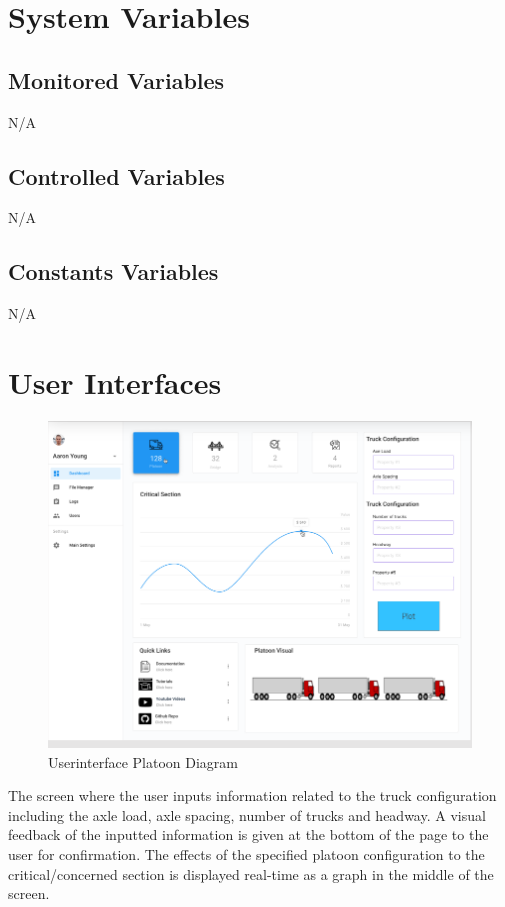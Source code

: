 \documentclass[12pt, titlepage]{article}
\begin{document}
\section{System Variables}

\subsection{Monitored Variables}
N/A
\subsection{Controlled Variables}
N/A
\subsection{Constants Variables}
N/A
\section{User Interfaces}
\begin{figure}[H]
  \includegraphics[]{../images/Userinterface-Platoon.PNG}
  \caption{Userinterface Platoon Diagram}
  \label{fig:userinterface-platoon-diagram}
\end{figure}
The screen where the user inputs information related to the truck configuration including the axle load, axle spacing, number of trucks and headway. A visual feedback of the inputted information is given at the bottom of the page to the user for confirmation. The effects of the specified platoon configuration to the critical/concerned section is displayed real-time as a graph in the middle of the screen. \\\\
\end{document}
